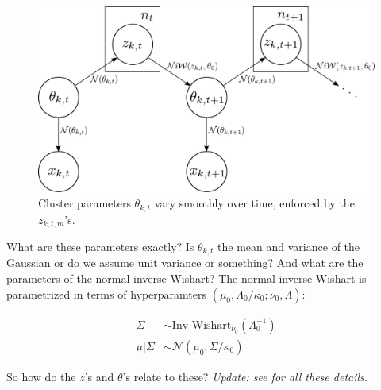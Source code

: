 \documentclass[11pt]{article}
\newcommand{\paperlink}[1]{\href{/Users/adkein/Documents/papers/#1.pdf}{\cite{#1}}}
\begin{document}
\begin{figure}[h]
\centering
\includegraphics[scale=0.35]{../fig/directed_gm.pdf}
\caption{Cluster parameters $\theta_{k,t}$ vary smoothly over time, enforced by the $z_{k,t,m}$'s.}
\label{fig:gm1}
\end{figure}

What are these parameters exactly? Is $\theta_{k,t}$ the mean and variance of the Gaussian or do we assume unit variance or something? And what are the parameters of the normal inverse Wishart? The normal-inverse-Wishart is parametrized in terms of hyperparamters $(\mu_0, \Lambda_0/\kappa_0; \nu_0, \Lambda)$:

\begin{align*}
\Sigma &\sim \text{Inv-Wishart}_{\nu_0} (\Lambda_0^{-1}) \\
\mu|\Sigma &\sim \mathcal{N}(\mu_0,\Sigma/\kappa_0)
\end{align*}

\noindent So how do the $z$'s and $\theta$'s relate to these? {\it Update: see \paperlink{Neiswanger_2012} for all these details.}




\end{document}
